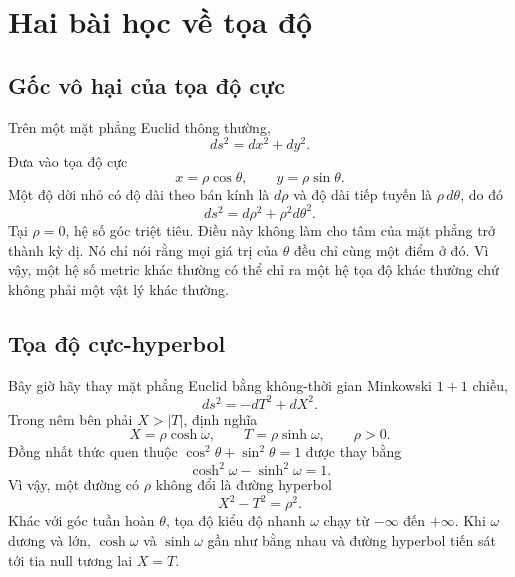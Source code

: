 \section{Hai bài học về tọa độ}

\subsection{Gốc vô hại của tọa độ cực}

Trên một mặt phẳng Euclid thông thường,
\begin{equation}
ds^2=dx^2+dy^2.
\end{equation}
Đưa vào tọa độ cực
\begin{equation}
x=\rho\cos\theta,
\qquad
y=\rho\sin\theta .
\end{equation}
Một độ dời nhỏ có độ dài theo bán kính là \(d\rho\) và độ dài tiếp tuyến là \(\rho\,d\theta\), do đó
\begin{equation}
ds^2=d\rho^2+\rho^2d\theta^2.
\label{eq:l03-polar}
\end{equation}
Tại \(\rho=0\), hệ số góc triệt tiêu. Điều này không làm cho tâm của mặt phẳng trở thành kỳ dị. Nó chỉ nói rằng mọi giá trị của \(\theta\) đều chỉ cùng một điểm ở đó. Vì vậy, một hệ số metric khác thường có thể chỉ ra một hệ tọa độ khác thường chứ không phải một vật lý khác thường.

\subsection{Tọa độ cực-hyperbol}

Bây giờ hãy thay mặt phẳng Euclid bằng không-thời gian Minkowski \(1+1\) chiều,
\begin{equation}
ds^2=-dT^2+dX^2.
\end{equation}
Trong nêm bên phải \(X>|T|\), định nghĩa
\begin{equation}
X=\rho\cosh\omega,
\qquad
T=\rho\sinh\omega,
\qquad \rho>0 .
\label{eq:l03-rindler-transform}
\end{equation}
Đồng nhất thức quen thuộc \(\cos^2\theta+\sin^2\theta=1\) được thay bằng
\begin{equation}
\cosh^2\omega-\sinh^2\omega=1.
\end{equation}
Vì vậy, một đường có \(\rho\) không đổi là đường hyperbol
\begin{equation}
X^2-T^2=\rho^2.
\end{equation}
Khác với góc tuần hoàn \(\theta\), tọa độ kiểu độ nhanh \(\omega\) chạy từ \(-\infty\) đến \(+\infty\). Khi \(\omega\) dương và lớn, \(\cosh\omega\) và \(\sinh\omega\) gần như bằng nhau và đường hyperbol tiến sát tới tia null tương lai \(X=T\).

